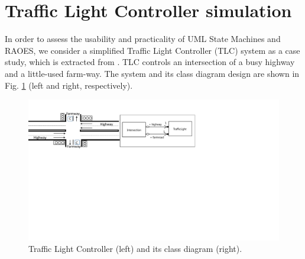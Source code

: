\section{Traffic Light Controller simulation}
\label{sec:casestudy}
In order to assess the usability and practicality of UML State Machines and RAOES, we consider a simplified Traffic Light Controller (TLC) system as a case study, which is extracted from \cite{katz2005contemporary}.
TLC controls an intersection of a busy highway and a little-used farm-way.
The system and its class diagram design are shown in Fig. \ref{fig:casestudy} (left and right, respectively).


\begin{figure}
	\centering
	\includegraphics[clip, trim=0.6cm 12.5cm 10.9cm 1.8cm, width=1.0\columnwidth]{figures/casestudy}
	\caption{Traffic Light Controller (left) and its class diagram (right).} 
	\label{fig:casestudy}
\end{figure}





